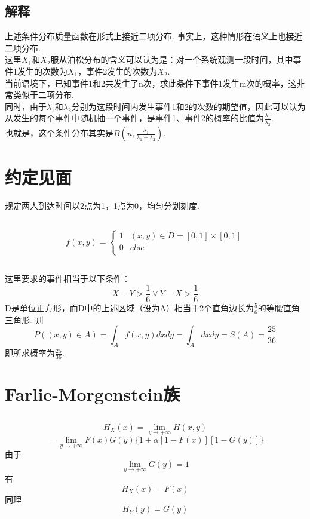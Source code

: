 \documentclass{article}
\begin{document}
\begin{CJK}{UTF8}{gbsn}
\subsection{解释}
上述条件分布质量函数在形式上接近二项分布. 事实上，这种情形在语义上也接近二项分布.
\\这里$X_{1}$和$X_{2}$服从泊松分布的含义可以认为是：对一个系统观测一段时间，其中事件1发生的次数为$X_{1}$，事件2发生的次数为$X_{2}$.
\\当前语境下，已知事件1和2共发生了n次，求此条件下事件1发生m次的概率，这非常类似于二项分布.
\\同时，由于$\lambda_{1}$和$\lambda_{2}$分别为这段时间内发生事件1和2的次数的期望值，因此可以认为从发生的每个事件中随机抽一个事件，是事件1、事件2的概率的比值为$\frac{\lambda_{1}}{\lambda_{2}}$.
\\也就是，这个条件分布其实是$B(n,\frac{\lambda_{1}}{\lambda_{1}+\lambda_{2}})$.
\section{约定见面}
规定两人到达时间以2点为1，1点为0，均匀分划刻度.
\subsection{}
\begin{equation}
    f(x,y)=\left\{
    \begin{array}{cl}
    1 & (x,y)\in D=[0,1]\times[0,1]\\
    0 & else\\
    \end{array}\right.
\end{equation}
\subsection{}
这里要求的事件相当于以下条件：
$$ X-Y>\frac{1}{6}\lor Y-X>\frac{1}{6}$$
D是单位正方形，而D中的上述区域（设为A）相当于2个直角边长为$\frac{5}{6}$的等腰直角三角形. 则
$$ P((x,y)\in A)=\int_{A}f(x,y)dxdy=\int_{A}dxdy=S(A)=\frac{25}{36}$$
即所求概率为$\frac{25}{36}$.
\section{Farlie-Morgenstein族}
\subsection{}
$$ H_{X}(x)=\lim\limits_{y\to+\infty}H(x,y)$$
$$ =\lim\limits_{y\to+\infty}F(x)G(y)\{1+\alpha[1-F(x)][1-G(y)]\}$$
由于
$$\lim\limits_{y\to+\infty}G(y)=1$$
有
$$ H_{X}(x)=F(x)$$
同理
$$ H_{Y}(y)=G(y)$$

\end{CJK}
\end{document}
